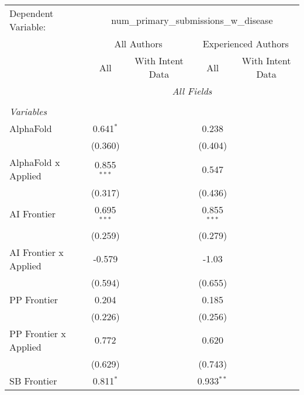 \begingroup
\centering
\begin{tabular}{lcccccc}
   \tabularnewline \midrule \midrule
   Dependent Variable: & \multicolumn{6}{c}{num\_primary\_submissions\_w\_disease}\\
 & \multicolumn{3}{c}{All Authors} & \multicolumn{3}{c}{Experienced Authors} \\
\cmidrule(lr){2-4} \cmidrule(lr){5-7}
 & \multicolumn{1}{c}{All} & \multicolumn{2}{c}{With Intent Data} & \multicolumn{1}{c}{All} & \multicolumn{2}{c}{With Intent Data} \\
\cmidrule(lr){2-2} \cmidrule(lr){3-4} \cmidrule(lr){5-5} \cmidrule(lr){6-7}
 & \multicolumn{6}{c}{\textit{All Fields}} \\ \\
   \emph{Variables}\\
   AlphaFold             & 0.641$^{*}$   &         &         & 0.238         &         &   \\   
                         & (0.360)       &         &         & (0.404)       &         &   \\   
   AlphaFold x Applied   & 0.855$^{***}$ &         &         & 0.547         &         &   \\   
                         & (0.317)       &         &         & (0.436)       &         &   \\   
   AI Frontier           & 0.695$^{***}$ &         &         & 0.855$^{***}$ &         &   \\   
                         & (0.259)       &         &         & (0.279)       &         &   \\   
   AI Frontier x Applied & -0.579        &         &         & -1.03         &         &   \\   
                         & (0.594)       &         &         & (0.655)       &         &   \\   
   PP Frontier           & 0.204         &         &         & 0.185         &         &   \\   
                         & (0.226)       &         &         & (0.256)       &         &   \\   
   PP Frontier x Applied & 0.772         &         &         & 0.620         &         &   \\   
                         & (0.629)       &         &         & (0.743)       &         &   \\   
   SB Frontier           & 0.811$^{*}$   &         &         & 0.933$^{**}$  &         &   \\   

\end{tabular}
